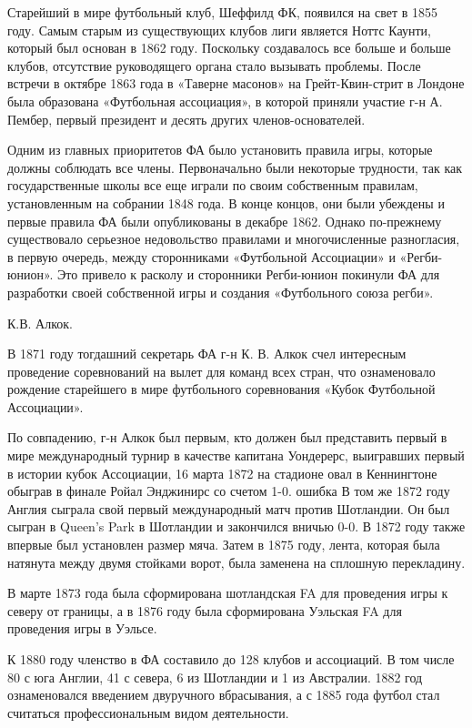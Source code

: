 Старейший в мире футбольный клуб, Шеффилд ФК, появился на свет в 1855 году. Самым старым из существующих клубов лиги является Ноттс Каунти, который был основан в 1862 году. Поскольку создавалось все больше и больше клубов, отсутствие руководящего органа стало вызывать проблемы. После встречи в октябре 1863 года в «Таверне масонов» на Грейт-Квин-стрит в Лондоне была образована «Футбольная ассоциация», в которой приняли участие г-н А. Пембер, первый президент и десять других членов-основателей.

Одним из главных приоритетов ФА было установить правила игры, которые должны соблюдать все члены. Первоначально были некоторые трудности, так как государственные школы все еще играли по своим собственным правилам, установленным на собрании 1848 года. В конце концов, они были убеждены и первые правила ФА были опубликованы в декабре 1862. Однако по-прежнему существовало серьезное недовольство правилами и многочисленные разногласия, в первую очередь, между сторонниками «Футбольной Ассоциации» и «Регби-юнион». Это привело к расколу и сторонники Регби-юнион покинули ФА для разработки своей собственной игры и создания «Футбольного союза регби».

К.В. Алкок.

В 1871 году тогдашний секретарь ФА г-н К. В. Алкок счел интересным проведение соревнований на вылет для команд всех стран, что ознаменовало рождение старейшего в мире футбольного соревнования «Кубок Футбольной Ассоциации».

По совпадению, г-н Алкок был первым, кто должен был представить первый в мире международный турнир в качестве капитана Уондерерс, выигравших первый в истории кубок Ассоциации, 16 марта 1872 на стадионе овал в Кеннингтоне обыграв в финале Ройал Энджинирс со счетом 1-0. ошибка В том же 1872 году Англия сыграла свой первый международный матч против Шотландии. Он был сыгран в Queen's Park в Шотландии и закончился вничью 0-0. В 1872 году также впервые был установлен размер мяча. Затем в 1875 году, лента, которая была натянута между двумя стойками ворот, была заменена на сплошную перекладину.

В марте 1873 года была сформирована шотландская FA для проведения игры к северу от границы, а в 1876 году была сформирована Уэльская FA для проведения игры в Уэльсе.

К 1880 году членство в ФА составило до 128 клубов и ассоциаций. В том числе 80 с юга Англии, 41 с севера, 6 из Шотландии и 1 из Австралии. 1882 год ознаменовался введением двуручного вбрасывания, а с 1885 года футбол стал считаться профессиональным видом деятельности.

